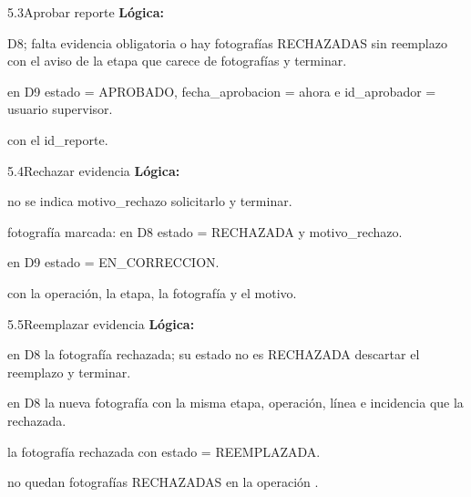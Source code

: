 \begin{minispec}{5.3}{Aprobar reporte}
\textbf{Lógica:}
\begin{logica}
    \item {} D8;  falta evidencia obligatoria o hay fotografías RECHAZADAS sin
    reemplazo   con el aviso de la etapa que
    carece de fotografías y terminar.
    \item {} en D9 estado = APROBADO, fecha\_aprobacion = ahora e
    id\_aprobador = usuario supervisor.
    \item {}  con el id\_reporte.
\end{logica}
\end{minispec}

\begin{minispec}{5.4}{Rechazar evidencia}
\textbf{Lógica:}
\begin{logica}
    \item {} no se indica motivo\_rechazo  solicitarlo y terminar.
    \item {} fotografía marcada:  en D8 estado = RECHAZADA y
    motivo\_rechazo.
    \item {} en D9 estado = EN\_CORRECCION.
    \item {}  con la operación, la etapa, la fotografía y
    el motivo.
\end{logica}
\end{minispec}

\begin{minispec}{5.5}{Reemplazar evidencia}
\textbf{Lógica:}
\begin{logica}
    \item {} en D8 la fotografía rechazada;  su estado no es RECHAZADA
     descartar el reemplazo y terminar.
    \item {} en D8 la nueva fotografía con la misma etapa, operación, línea e
    incidencia que la rechazada.
    \item {} la fotografía rechazada con estado = REEMPLAZADA.
    \item {} no quedan fotografías RECHAZADAS en la operación 
    .
\end{logica}
\end{minispec}

